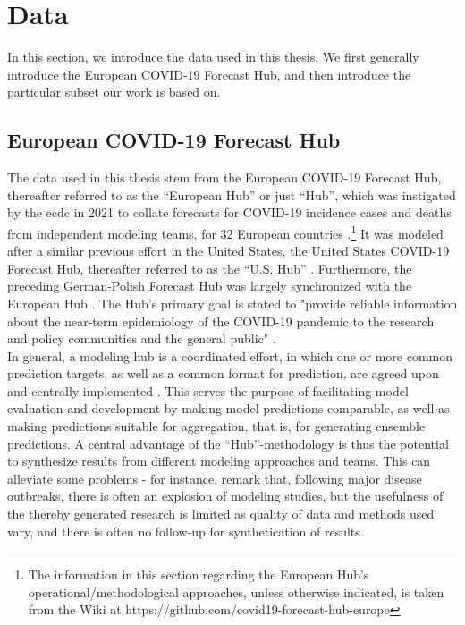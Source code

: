 \section{Data}
In this section, we introduce the data used in this thesis. We first generally introduce the European COVID-19 Forecast Hub, and then introduce the particular subset our work is based on.
\subsection{European COVID-19 Forecast Hub} \label{sub:hub_data}
The data used in this thesis stem from the European COVID-19 Forecast Hub, thereafter referred to as the ``European Hub'' or just ``Hub'', which was instigated by the \ac{ecdc} in 2021 to collate forecasts for COVID-19 incidence cases and deaths from independent modeling teams, for 32 European countries \citep{sherratt_european_2022}.\footnote{The information in this section regarding the European Hub's operational/methodological approaches, unless otherwise indicated, is taken from the Wiki at https://github.com/covid19-forecast-hub-europe} It was modeled after a similar previous effort in the United States, the United States COVID-19 Forecast Hub, thereafter referred to as the ``U.S. Hub'' \citep{cramer_united_2021}. Furthermore, the preceding German-Polish Forecast Hub was largely synchronized with the European Hub \citep{bracher_german_2020}. The Hub's primary goal is stated to "provide reliable information about the near-term epidemiology of the COVID-19 pandemic to the research and policy communities and the general public" \citep{sherratt_predictive_2022}.\\ 
In general, a modeling hub is a coordinated effort, in which one or more common prediction targets, as well as a common format for prediction, are agreed upon and centrally implemented \citep{reich_collaborative_2022}. This serves the purpose of facilitating model evaluation and development by making model predictions comparable, as well as making predictions suitable for aggregation, that is, for generating ensemble predictions. A central advantage of the ``Hub''-methodology is thus the potential to synthesize results from different modeling approaches and teams. This can alleviate some problems - for instance, \cite{metcalf_opportunities_2017} remark that, following major disease outbreaks, there is often an explosion of modeling studies, but the usefulness of the thereby generated research is limited as quality of data and methods used vary, and there is often no follow-up for synthetication of results. %

